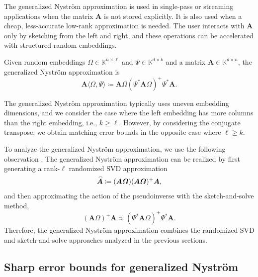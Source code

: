 \documentclass[11pt]{article}
\newcommand{\field}{\mathbb{K}}
\newcommand{\mat}[1]{\boldsymbol{#1}}
\newcommand{\hatbold}[1]{%
  \skew{4}\widehat{\smash{\boldsymbol{#1}}\mathstrut}}
\newcommand{\Ahat}{\smash{\hatbold{A}}}
\theoremstyle{definition}
\numberwithin{equation}{section}
\begin{document}
The generalized Nystr{\"o}m approximation \cite{WLRT08,CW09,TYUC17,Nak20} is used in single-pass or streaming applications when the matrix $\mat{A}$ is not stored explicitly. 
It is also used when a cheap, less-accurate low-rank approximation is needed.
The user interacts with $\mat{A}$ only by sketching from the left and right, and these operations can be accelerated with structured random embeddings.
\begin{definition} \label{def:generalized}
Given random embeddings $\mat{\varOmega} \in \field^{n \times \ell}$ and $\mat{\varPsi} \in \field^{d \times k}$ and a matrix $\mat{A} \in \field^{d \times n}$, the generalized Nystr\"om approximation is 
%
\begin{equation*}
    \mat{A}\langle \mat{\varOmega},\mat{\varPsi}\rangle \coloneqq \mat{A}\mat{\varOmega}(\mat{\varPsi}^*\mat{A}\mat{\varOmega})^+ \mat{\varPsi}^*\mat{A}.
\end{equation*}
\end{definition}
\noindent The generalized Nystr\"om approximation typically uses uneven embedding dimensions, and we consider the case where the left embedding has more columns than the right embedding, i.e., $k\ge \ell$.
However, by considering the conjugate transpose, we obtain matching error bounds in the opposite case where $\ell \ge k$.

To analyze the generalized Nystr\"om approximation, we use the following observation \cite{CW09,TYUC17,CEMT25}.
The generalized Nystr\"om approximation can be realized by first generating a rank-$\ell$ randomized SVD approximation
%
\begin{equation*} 
    \Ahat \coloneqq (\mat{A}\mat{\varOmega})(\mat{A}\mat{\varOmega})^+ \mat{A},
\end{equation*}
%
and then approximating the action of the pseudoinverse with the sketch-and-solve method,
%
\begin{equation*}
    (\mat{A}\mat{\varOmega})^+ \mat{A} \approx (\mat{\varPsi}^*\mat{A}\mat{\varOmega})^+ \mat{\varPsi}^*\mat{A}.%
\end{equation*}
%
Therefore, the generalized Nystr\"om approximation combines the randomized SVD and sketch-and-solve approaches analyzed in the previous sections.

\subsection{Sharp error bounds for generalized Nystr\"om}
\end{document}
